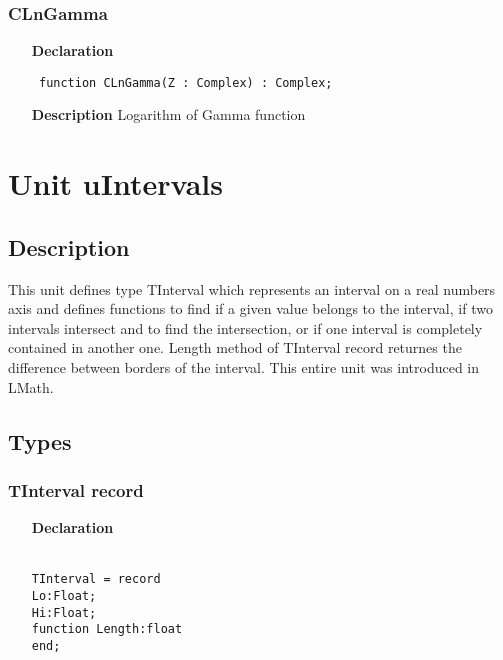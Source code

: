 \documentclass[12pt,a4paper,oneside]{report}
\newcommand{\lmath}[1]{   %
	\marginpar{\vspace{#1} 
		\begin{flushright}
			LMath
	\end{flushright} }
}
\newcommand{\declarationitem}[1]{\textbf{#1}}
\newcommand{\descriptiontitle}[1]{\textbf{#1}}
\newcommand{\code}[1]{\texttt{#1}}
\begin{document}
\subsubsection{CLnGamma}
\label{ucomplex-CLnGamma}
\begin{itemize}\item[\declarationitem{Declaration}\hfill]
\begin{flushleft}
\code{
function CLnGamma(Z : Complex) : Complex;}

\end{flushleft}

\par
\item[\descriptiontitle{Description}]
Logarithm of Gamma function

\end{itemize}

\section{Unit uIntervals}\lmath{-24pt}
\subsection{Description}
This unit defines type TInterval which represents an interval on a real numbers axis and defines functions to find if a given value belongs to the interval, if two intervals intersect and to find the intersection, or if one interval is completely contained in another one. Length method of TInterval record returnes the difference between borders of the interval. This entire unit was introduced in LMath.
\label{uIntervals}
\subsection{Types}
\subsubsection{TInterval record}
\begin{itemize}\label{uIntervals.TInterval}
\item[\declarationitem{Declaration}]
\begin{flushleft}
\code{\\
	TInterval = record \\
		\hspace{1cm}Lo:Float;\\
		\hspace{1cm}Hi:Float;\\
		\hspace{1cm}function Length:float\\
	end;}
\end{flushleft}
\end{itemize}
\end{document}
